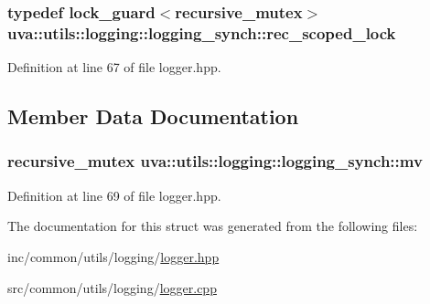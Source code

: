 \subsubsection[{rec\+\_\+scoped\+\_\+lock}]{\setlength{\rightskip}{0pt plus 5cm}typedef lock\+\_\+guard$<$recursive\+\_\+mutex$>$ {\bf uva\+::utils\+::logging\+::logging\+\_\+synch\+::rec\+\_\+scoped\+\_\+lock}}\label{structuva_1_1utils_1_1logging_1_1logging__synch_afaab265627f1f072fbfd927b6d2b6cb6}


Definition at line 67 of file logger.\+hpp.



\subsection{Member Data Documentation}
\hypertarget{structuva_1_1utils_1_1logging_1_1logging__synch_a85128bbf4931fcdd13b8b804e1789580}{}
\subsubsection[{mv}]{\setlength{\rightskip}{0pt plus 5cm}recursive\+\_\+mutex uva\+::utils\+::logging\+::logging\+\_\+synch\+::mv\hspace{0.3cm}{\ttfamily [static]}}\label{structuva_1_1utils_1_1logging_1_1logging__synch_a85128bbf4931fcdd13b8b804e1789580}


Definition at line 69 of file logger.\+hpp.



The documentation for this struct was generated from the following files\+:\begin{DoxyCompactItemize}
\item 
inc/common/utils/logging/\hyperlink{logger_8hpp}{logger.\+hpp}\item 
src/common/utils/logging/\hyperlink{logger_8cpp}{logger.\+cpp}\end{DoxyCompactItemize}
